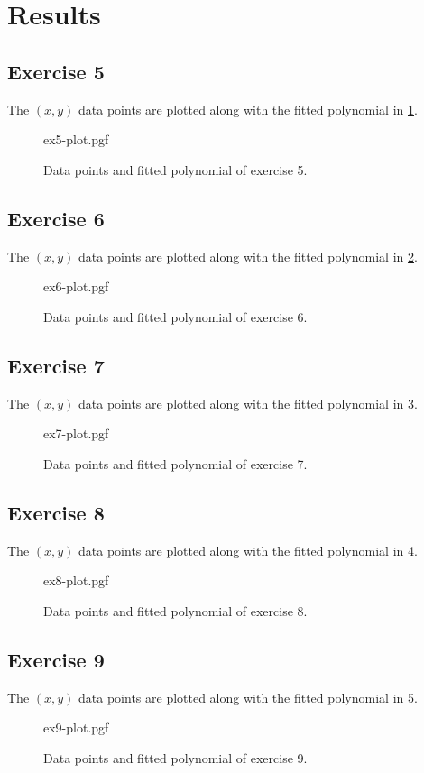 \section{Results}

\subsection{Exercise 5}
The $\left( x,y \right)$ data points are plotted along with the fitted
polynomial in \cref{fig:ex5}.
\begin{figure}[tb!]
    \centering
    {ex5-plot.pgf}
    \caption{Data points and fitted polynomial of exercise 5.}
    \label{fig:ex5}
\end{figure}

\subsection{Exercise 6}
The $\left( x,y \right)$ data points are plotted along with the fitted
polynomial in \cref{fig:ex6}.
\begin{figure}[tb!]
    \centering
    {ex6-plot.pgf}
    \caption{Data points and fitted polynomial of exercise 6.}
    \label{fig:ex6}
\end{figure}
\subsection{Exercise 7}
The $\left( x,y \right)$ data points are plotted along with the fitted
polynomial in \cref{fig:ex7}.
\begin{figure}[tb!]
    \centering
    {ex7-plot.pgf}
    \caption{Data points and fitted polynomial of exercise 7.}
    \label{fig:ex7}
\end{figure}
\subsection{Exercise 8}
The $\left( x,y \right)$ data points are plotted along with the fitted
polynomial in \cref{fig:ex8}.
\begin{figure}[tb!]
    \centering
    {ex8-plot.pgf}
    \caption{Data points and fitted polynomial of exercise 8.}
    \label{fig:ex8}
\end{figure}
\subsection{Exercise 9}
The $\left( x,y \right)$ data points are plotted along with the fitted
polynomial in \cref{fig:ex9}.
\begin{figure}[tb!]
    \centering
    {ex9-plot.pgf}
    \caption{Data points and fitted polynomial of exercise 9.}
    \label{fig:ex9}
\end{figure}
